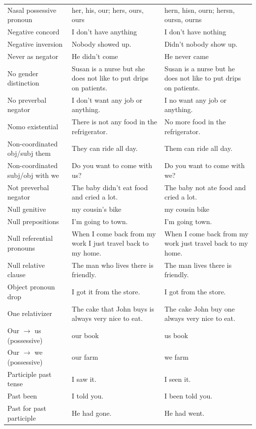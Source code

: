 \begin{longtable}{
  >{\raggedright\arraybackslash}p{3.2cm}
  >{\raggedright\arraybackslash}p{4.8cm}
  >{\raggedright\arraybackslash}p{4.8cm}
}
Nasal possessive pronoun & her, his, our; hers, ours, ours & hern, hisn, ourn; hersn, oursn, ourns \\
Negative concord & I don't have anything & I don't have nothing \\
Negative inversion & Nobody showed up. & Didn't nobody show up. \\
Never as negator & He didn't come & He never came \\
No gender distinction & Susan is a nurse but she does not like to put drips on patients. & Susan is a nurse but he does not like to put drips on patients. \\
No preverbal negator & I don't want any job or anything. & I no want any job or anything. \\
Nomo existential & There is not any food in the refrigerator. & No more food in the refrigerator. \\
Non-coordinated obj/subj them & They can ride all day. & Them can ride all day. \\
Non-coordinated subj/obj with we & Do you want to come with us? & Do you want to come with we? \\
Not preverbal negator & The baby didn't eat food and cried a lot. & The baby not ate food and cried a lot. \\
Null genitive & my cousin's bike & my cousin bike \\
Null prepositions & I'm going to town. & I'm going town. \\
Null referential pronouns & When I come back from my work I just travel back to my home. & When I come back from my work just travel back to my home. \\
Null relative clause & The man who lives there is friendly. & The man lives there is friendly. \\
Object pronoun drop & I got it from the store. & I got from the store. \\
One relativizer & The cake that John buys is always very nice to eat. & The cake John buy one always very nice to eat. \\
Our $\rightarrow$ us (possessive) & our book & us book \\
Our $\rightarrow$ we (possessive) & our farm & we farm \\
Participle past tense & I saw it. & I seen it. \\
Past been & I told you. & I been told you. \\
Past for past participle & He had gone. & He had went. \\

\end{longtable}
